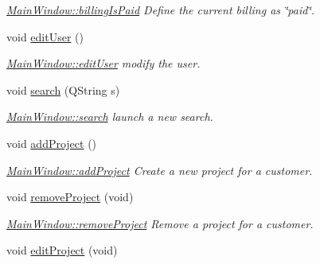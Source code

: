 \begin{DoxyCompactItemize}
\begin{DoxyCompactList}\small\item\em \hyperlink{classGui_1_1MainWindow_a149c8e2210fa249c0510e1f607079fde}{Main\-Window\-::billing\-Is\-Paid} Define the current billing as \char`\"{}paid\char`\"{}. \end{DoxyCompactList}\item 
void \hyperlink{classGui_1_1MainWindow_a5dfb182cf52eb48f71e70cd193ef7a8b}{edit\-User} ()
\begin{DoxyCompactList}\small\item\em \hyperlink{classGui_1_1MainWindow_a5dfb182cf52eb48f71e70cd193ef7a8b}{Main\-Window\-::edit\-User} modify the user. \end{DoxyCompactList}\item 
void \hyperlink{classGui_1_1MainWindow_af50656b4c43aa53bae1ac4a3d6b4c953}{search} (Q\-String s)
\begin{DoxyCompactList}\small\item\em \hyperlink{classGui_1_1MainWindow_af50656b4c43aa53bae1ac4a3d6b4c953}{Main\-Window\-::search} launch a new search. \end{DoxyCompactList}\item 
void \hyperlink{classGui_1_1MainWindow_acc49a5a35dfc7eb8f835ff425618e2d9}{add\-Project} ()
\begin{DoxyCompactList}\small\item\em \hyperlink{classGui_1_1MainWindow_acc49a5a35dfc7eb8f835ff425618e2d9}{Main\-Window\-::add\-Project} Create a new project for a customer. \end{DoxyCompactList}\item 
\hypertarget{classGui_1_1MainWindow_a7e00765c3da7a97ba937bdecb095200b}{void \hyperlink{classGui_1_1MainWindow_a7e00765c3da7a97ba937bdecb095200b}{remove\-Project} (void)}\label{classGui_1_1MainWindow_a7e00765c3da7a97ba937bdecb095200b}

\begin{DoxyCompactList}\small\item\em \hyperlink{classGui_1_1MainWindow_a7e00765c3da7a97ba937bdecb095200b}{Main\-Window\-::remove\-Project} Remove a project for a customer. \end{DoxyCompactList}\item 
\hypertarget{classGui_1_1MainWindow_adade8f873eb855b2ca0bb851c91cc5a9}{void \hyperlink{classGui_1_1MainWindow_adade8f873eb855b2ca0bb851c91cc5a9}{edit\-Project} (void)}\label{classGui_1_1MainWindow_adade8f873eb855b2ca0bb851c91cc5a9}


\end{DoxyCompactItemize}
